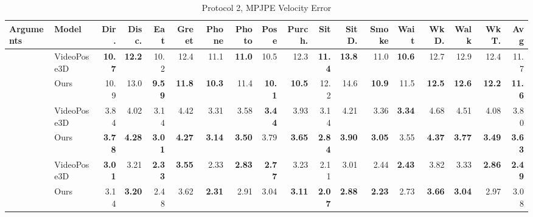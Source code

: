 \documentclass[10pt,twocolumn,letterpaper]{article}
\begin{document}
\begin{center}
\begin{table}
\small
\setlength\tabcolsep{2.3pt}
\begin{tabular}{l|l|rrrrrrrrrrrrrrrr} 
\hline
Arguments & Model & Dir. & Disc. & Eat & Greet & Phone & Photo & Pose & Purch. & Sit & SitD. & Smoke & Wait & WkD. & Walk & WkT. & \textbf{Avg} \\
\hline
 & VideoPose3D & \textbf{10.7} & \textbf{12.2} & 10.2 & 12.4 & 11.1 & \textbf{11.0} & 10.5 & 12.3 & \textbf{11.4} & \textbf{13.8} & 11.0 & \textbf{10.6} & 12.7 & 12.9 & 12.4 & 11.7  \\
 & Ours & 10.9 & 13.0 & \textbf{9.59} & \textbf{11.8} & \textbf{10.3} & 11.4 & \textbf{10.1} & \textbf{10.5} & 12.2 & 14.6 & \textbf{10.9} & 11.5 & \textbf{12.5} & \textbf{12.6} & \textbf{12.2} & \textbf{11.6} \\
\hline
 & VideoPose3D & 3.84 & 4.02 & 3.14 & 4.42 & 3.31 & 3.58 & \textbf{3.44} & 3.93 & 3.14 & 4.21 & 3.36 & \textbf{3.34} & 4.68 & 4.51 & 4.08 & 3.80 \\
 & Ours & \textbf{3.78} & \textbf{4.28} & \textbf{3.01} & \textbf{4.27} & \textbf{3.14} & \textbf{3.50} & 3.79 & \textbf{3.65} & \textbf{2.84} & \textbf{3.90} & \textbf{3.05} & 3.55 & \textbf{4.37} & \textbf{3.77} & \textbf{3.49} & \textbf{3.63}\\
\hline

 & VideoPose3D & \textbf{3.01} & 3.21 & \textbf{2.33} & \textbf{3.55} & 2.33 & \textbf{2.83} & \textbf{2.77} & 3.23 & 2.11 & 3.01 & 2.44 & \textbf{2.43} & 3.82 & 3.33 & \textbf{2.86} & \textbf{2.49} \\
 & Ours & 3.14 & \textbf{3.20} & 2.48 & 3.62 & \textbf{2.31} & 2.91 & 3.04 & \textbf{3.11} & \textbf{2.07} & \textbf{2.88} & \textbf{2.23} & 2.73 & \textbf{3.66} & \textbf{3.04} & 2.97 & 3.08 \\

 
\hline

\hline
\end{tabular}

\caption{Protocol 2, MPJPE Velocity Error}
\label{tab:V-MPJPE Error}
\end{table}
\end{center}


\end{document}
